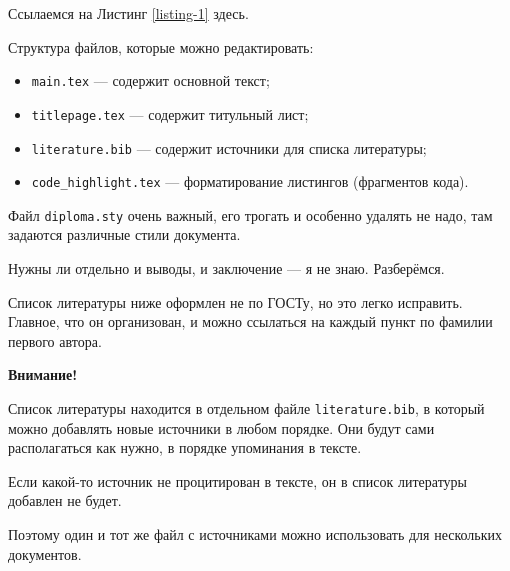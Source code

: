 \documentclass[a4paper,14pt]{extarticle}
\begin{document}
\pagebreak
Ссылаемся на Листинг \ref{listing-1} здесь.

\pagebreak
{}
Структура файлов, которые можно редактировать:

\begin{itemize}
    \item \verb|main.tex| --- содержит основной текст;
    \item \verb|titlepage.tex| --- содержит титульный лист;
    \item \verb|literature.bib| --- содержит источники для списка литературы;
    \item \verb|code_highlight.tex| --- форматирование листингов (фрагментов кода).
\end{itemize}

Файл \verb|diploma.sty| очень важный, его трогать и особенно удалять не надо, там задаются различные стили документа.

Нужны ли отдельно и выводы, и заключение --- я не знаю. Разберёмся.

Список литературы ниже оформлен не по ГОСТу, но это легко исправить. Главное, что он организован, и можно ссылаться на каждый пункт по фамилии первого автора.

\textbf{Внимание!}

Список литературы находится в отдельном файле \verb|literature.bib|, в который можно добавлять новые источники в любом порядке. Они будут сами располагаться как нужно, в порядке упоминания в тексте.

Если какой-то источник не процитирован в тексте, он в список литературы добавлен не будет.

Поэтому один и тот же файл с источниками можно использовать для нескольких документов.

\printbibliography
\end{document}
